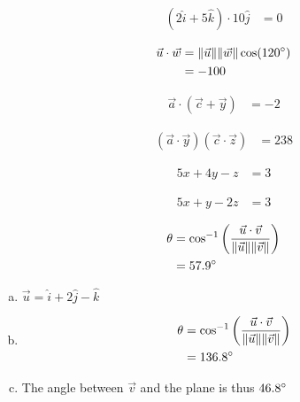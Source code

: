 \documentclass[10pt]{extarticle}
\begin{document}
  \begin{problem}{13.3}
    \begin{description}[font=\normalfont]
      \item[4:] 
        \begin{align*}
          (2\hat{i} + 5\hat{k}) \cdot 10\hat{j} &= 0
        \end{align*}
      \item[6:] 
        \begin{align*}
          \vec{u} \cdot \vec{w} &= \Vert \vec{u} \Vert \Vert \vec{w} \Vert \cos(120\degree)\\
                                &= -100
        \end{align*}
      \item[12:]
        \begin{align*}
          \vec a \cdot (\vec{c} + \vec y) &= -2
        \end{align*}
      \item[14:]
        \begin{align*}
          (\vec a \cdot \vec y)(\vec c \cdot \vec z) &= 238
        \end{align*}
      \item[22:]
        \begin{align*}
          5x + 4y - z &= 3
        \end{align*}
      \item[24:]
        \begin{align*}
          5x + y - 2z &= 3
        \end{align*}
      \item[32:]
        \begin{align*}
          \theta &= \cos^{-1}\left(\frac{\vec u \cdot \vec v}{\Vert \vec u \Vert \Vert \vec v \Vert}\right)\\
                 &= 57.9\degree
        \end{align*}
      \item[44:]
        \begin{enumerate}[(a)]
          \item $\vec u = \hat{i} + 2\hat{j} - \hat{k}$
          \item
            \begin{align*}
              \theta &= \cos^{-1}\left(\frac{\vec u \cdot \vec v}{\Vert \vec u \Vert \Vert \vec v \Vert}\right)\\
                     &= 136.8\degree
            \end{align*}
          \item The angle between $\vec v$ and the plane is thus $46.8\degree$

\end{enumerate}
\end{description}
\end{problem}
\end{document}
